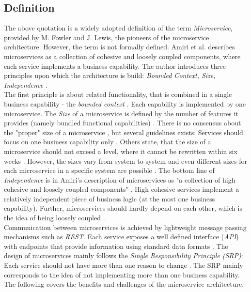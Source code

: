 \subsection{Definition}
The above quotation is a widely adopted definition of the term \textit{Microservice}, provided by M. Fowler and J. Lewis, the pioneers of the microservice architecture. However, the term is not formally defined. Amiri et al. describes microservices as a collection of cohesive and loosely coupled components, where each service implements a business capability.
 The author introduces three principles upon which the architecture is build: \textit{Bounded Context, Size, Independence} \cite{ObjectAwareAmiri}. \\
 The first principle is about related functionality, that is combined in a single business capability - the  \textit{bounded context} \cite{FunctionalDecompositionHeinrich}. Each capability is implemented by one microservice. 
The \textit{Size} of a microservice is defined by the number of features it provides (namely bundled functional capabilities)  \cite{WorkloadbasedClustering}. There is no consensus about the "proper" size of a microservice \cite{DomainEngineeringMunezero}, but several guidelines exists: Services should focus on one business capability only \cite{ObjectAwareAmiri}. Others state, that the size of a microservice should not exceed a level, where it cannot be rewritten within six weeks \cite{WorkloadbasedClustering}. However, the sizes vary from system to system \cite{FunctionalDecompositionHeinrich} and even different sizes for each microservice in a specific system are possible \cite{DomainEngineeringMunezero}. The bottom line of \textit{Independence} is in Amiri's description of microservices as "a collection of high cohesive and loosely coupled components" \cite{ObjectAwareAmiri}. High cohesive services implement a relatively independent piece of business logic (at the most one business capability). Further, microservices should hardly depend on each other, which is the idea of being loosely coupled \cite{DataflowDrivenChen}.
\\
Communication between microservices is achieved by lightweight message passing mechanisms such as \textit{REST}. Each service exposes a well defined interface (\textit{API}) with endpoints that provide information using standard data formats \cite{FunctionalDecompositionHeinrich}. 
The design of microservices mainly follows the \textit{Single Responsibility Principle (SRP)}: Each service should not have more than one reason to change \cite{TowardsUnderstandingEvolution}. The SRP mainly corresponds to the idea of not implementing more than one business capability.
The following covers the benefits and challenges of the microservice architecture.


